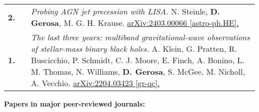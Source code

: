 {\begin{longtable}{rp{0.3cm}p{15.8cm}}
%
\textbf{2.} & & \textit{Probing AGN jet precession with LISA.}
\newline{}
N. Steinle, \textbf{D. Gerosa}, M. G. H. Krause.
\newline{}
\href{https://arxiv.org/abs/2403.00066}{arXiv:2403.00066 [astro-ph.HE].}
\vspace{0.09cm}\\
%
\textbf{1.} & & \textit{The last three years: multiband gravitational-wave observations of stellar-mass binary black holes.}
\newline{}
A. Klein, G. Pratten, R. Buscicchio, P. Schmidt, C. J. Moore, E. Finch, A. Bonino, L. M. Thomas, N. Williams, \textbf{D. Gerosa}, S. McGee, M. Nicholl, A. Vecchio.
\newline{}
\href{https://arxiv.org/abs/2204.03423}{arXiv:2204.03423 [gr-qc].}
\vspace{0.09cm}\\
%
\end{longtable} }
\textcolor{color1}{\textbf{Papers in major peer-reviewed journals:}}
\vspace{-0.5cm}

